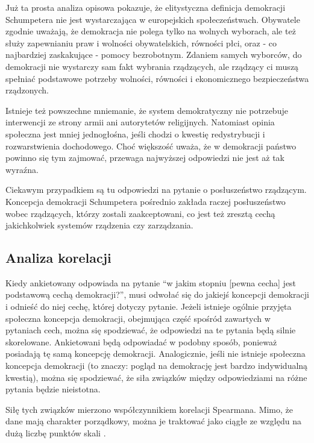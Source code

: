 \documentclass[12pt]{article}
\begin{document}
Już ta prosta analiza opisowa pokazuje, że elitystyczna definicja demokracji Schumpetera nie jest wystarczająca w europejskich społeczeństwach. Obywatele zgodnie uważają, że demokracja nie polega tylko na wolnych wyborach, ale też służy zapewnianiu praw i wolności obywatelskich, równości płci, oraz - co najbardziej zaskakujące - pomocy bezrobotnym. Zdaniem samych wyborców, do demokracji nie wystarczy sam fakt wybrania rządzących, ale rządzący ci muszą spełniać podstawowe potrzeby wolności, równości i ekonomicznego bezpieczeństwa rządzonych.

Istnieje też powszechne mniemanie, że system demokratyczny nie potrzebuje interwencji ze strony armii ani autorytetów religijnych. Natomiast opinia społeczna jest mniej jednogłośna, jeśli chodzi o kwestię redystrybucji i rozwarstwienia dochodowego. Choć większość uważa, że w demokracji państwo powinno się tym zajmować, przewaga najwyższej odpowiedzi nie jest aż tak wyraźna.

Ciekawym przypadkiem są tu odpowiedzi na pytanie o posłuszeństwo rządzącym. Koncepcja demokracji Schumpetera pośrednio zakłada raczej posłuszeństwo wobec rządzących, którzy zostali zaakceptowani, co jest też zresztą cechą jakichkolwiek systemów rządzenia czy zarządzania.

\hypertarget{analiza-korelacji}{%
\subsection{Analiza korelacji}\label{analiza-korelacji}}

Kiedy ankietowany odpowiada na pytanie ``w jakim stopniu {[}pewna cecha{]} jest podstawową cechą demokracji?'', musi odwołać się do jakiejś koncepcji demokracji i odnieść do niej cechę, której dotyczy pytanie. Jeżeli istnieje ogólnie przyjęta społeczna koncepcja demokracji, obejmująca część spośród zawartych w pytaniach cech, można się spodziewać, że odpowiedzi na te pytania będą silnie skorelowane. Ankietowani będą odpowiadać w podobny sposób, ponieważ posiadają tę samą koncepcję demokracji. Analogicznie, jeśli nie istnieje społeczna koncepcja demokracji (to znaczy: pogląd na demokrację jest bardzo indywidualną kwestią), można się spodziewać, że siła związków między odpowiedziami na różne pytania będzie nieistotna.

Siłę tych związków mierzono współczynnikiem korelacji Spearmana. Mimo, że dane mają charakter porządkowy, można je traktować jako ciągłe ze względu na dużą liczbę punktów skali \citep{Revelle}.
\end{document}

